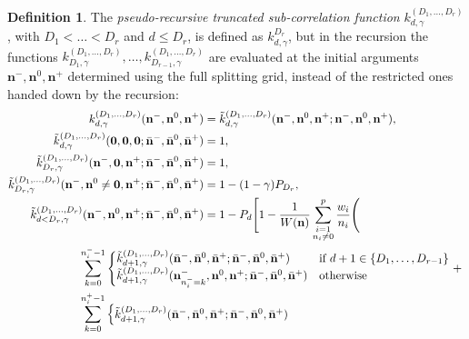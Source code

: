 \documentclass[a4paper]{article}
\newcommand{\nvecs}{\mathbf n^-, \mathbf n^0, \mathbf n^+}
\newcommand{\barnvecs}{\bar{\mathbf n}^-, \bar{\mathbf n}^0, \bar{\mathbf n}^+}
\theoremstyle{definition}
\newtheorem{definition}{Definition}
\begin{document}
    \begin{definition}
        \label{def:prtruncorr}
        The \emph{pseudo-recursive truncated sub-correlation function} $k^{(D_1,\ldots,D_r)}_{d,\gamma}$, with $D_1 < \ldots < D_r$ and $d\le D_r$, is defined as $k^{D_r}_{d,\gamma}$, but in the recursion the functions $k^{(D_1,\ldots,D_r)}_{D_1,\gamma}, \ldots, k^{(D_1,\ldots,D_r)}_{D_{r-1},\gamma}$ are evaluated at the initial arguments $\nvecs$ determined using the full splitting grid, instead of the restricted ones handed down by the recursion:
        \begin{align}
            k^{(D_1,\ldots,D_r)}_{d,\gamma}(\nvecs)
            &= \tilde k^{(D_1,\ldots,D_r)}_{d,\gamma}(\nvecs;\nvecs), \\
            \tilde k^{(D_1,\ldots,D_r)}_{d,\gamma}(\mathbf 0, \mathbf 0, \mathbf 0; \barnvecs)
            &= 1, \\
            \tilde k^{(D_1,\ldots,D_r)}_{D_r,\gamma}(\mathbf n^-, \mathbf 0, \mathbf n^+; \barnvecs)
            &= 1, \label{eq:prtruncorrbasen00} \\
            \tilde k^{(D_1,\ldots,D_r)}_{D_r,\gamma}(\mathbf n^-, \mathbf n^0\ne \mathbf0, \mathbf n^+; \barnvecs)
            &= 1 - (1 - \gamma) P_{D_r}, \label{eq:prtruncorrbasen0nz} \\
            \tilde k^{(D_1,\ldots,D_r)}_{d<D_r,\gamma}(\nvecs;\barnvecs)
            &= 1 - P_d \Bigg[1 - \frac1{W(\mathbf n)}
                \sum_{\substack{i=1 \\ n_i\ne 0}}^p \frac{w_i}{n_i} \Bigg( \notag \\
                    &\hspace{-25ex} \sum_{k=0}^{n^-_i - 1} \begin{cases}
                        \tilde k^{(D_1,\ldots,D_r)}_{d+1,\gamma}(\barnvecs;\barnvecs)
                            & \text{if $d+1 \in \{D_1, \ldots, D_{r-1}\}$} \\
                        \tilde k^{(D_1,\ldots,D_r)}_{d+1,\gamma}(\mathbf n^-_{n^-_i=k}, \mathbf n^0, \mathbf n^+;\barnvecs)
                            & \text{otherwise}
                    \end{cases}
                    + {} \notag \\
                    &\hspace{-25ex} \sum_{k=0}^{n^+_i - 1} \begin{cases}
                        \tilde k^{(D_1,\ldots,D_r)}_{d+1,\gamma}(\barnvecs;\barnvecs)

\end{cases}
\end{align}
\end{definition}
\end{document}
